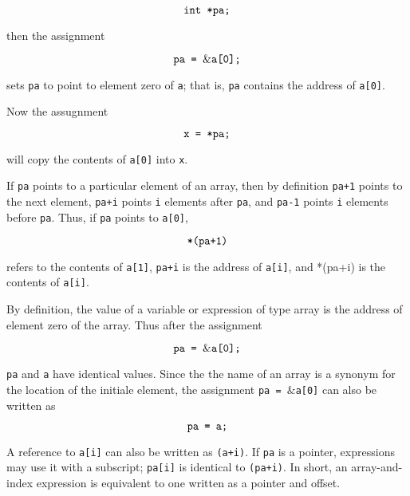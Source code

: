 $$\hbox{{\tt int *pa;}}$$

then the assignment

$$\hbox{{\tt pa = $\&$a[0];}}$$

sets {\tt pa} to point to element zero of {\tt a}; that is, {\tt pa} contains the address of {\tt a[0]}.

\vskip 1mm
Now the assugnment

$$\hbox{{\tt x = *pa;}}$$

will copy the contents of {\tt a[0]} into {\tt x}.

\filbreak
\vskip 1cm
If {\tt pa} points to a particular element of an array, then by definition {\tt pa+1} points to the next element, {\tt pa+i} points {\tt i} elements after {\tt pa}, and {\tt pa-1} points {\tt i} elements before {\tt pa}. Thus, if {\tt pa} points to {\tt a[0]},

$$\hbox{{\tt *(pa+1)}}$$

refers to the contents of {\tt a[1]}, {\tt pa+i} is the address of {\tt a[i]}, and *(pa+i) is the contents of {\tt a[i]}.

\filbreak
\vskip 1cm
By definition, the value of a variable or expression of type array is the address of element zero of the array. Thus after the assignment

$$\hbox{{\tt pa = $\&$a[0];}}$$

{\tt pa} and {\tt a} have identical values. Since the the name of an array is a synonym for the location of the initiale element, the assignment {\tt pa = $\&$a[0]} can also be written as

$$\hbox{{\tt pa = a;}}$$

A reference to {\tt a[i]} can also be written as {\tt *(a+i)}. If {\tt pa} is a pointer, expressions may use it with a subscript; {\tt pa[i]} is identical to {\tt *(pa+i)}. In short, an array-and-index expression is equivalent to one written as a pointer and offset.

\filbreak
\vfill\eject
\bye
